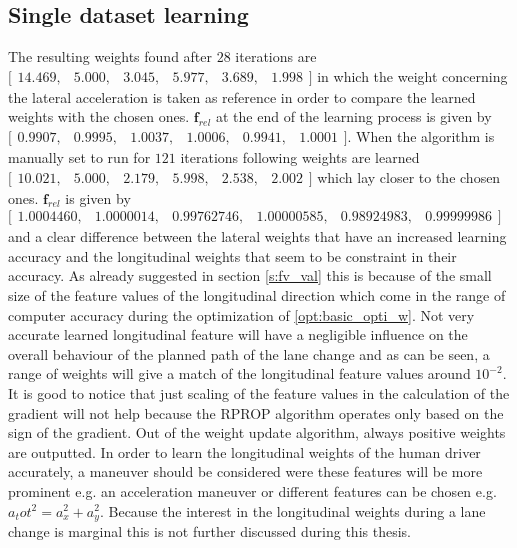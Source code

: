 \subsection{Single dataset learning}\label{s:SDL}
The resulting weights found after $28$ iterations are $\bigl[ \begin{smallmatrix} 14.469,&5.000,&3.045,&5.977,&3.689,&1.998\end{smallmatrix}\bigr]$ in which the weight concerning the lateral acceleration is taken as reference in order to compare the learned weights with the chosen ones. $\bm{f}_{rel}$ at the end of the learning process is given by $\bigl[ \begin{smallmatrix} 0.9907,&0.9995,&1.0037,&1.0006,&0.9941,&1.0001\end{smallmatrix}\bigr]$. When the algorithm is manually set to run for $121$ iterations following weights are learned $\bigl[ \begin{smallmatrix} 10.021,&5.000,&2.179,&5.998,&2.538,&2.002\end{smallmatrix}\bigr]$ which lay closer to the chosen ones.  $\bm{f}_{rel}$ is given by $\bigl[ \begin{smallmatrix} 1.0004460,&1.0000014,&0.99762746,&1.00000585,&0.98924983,&0.99999986\end{smallmatrix}\bigr]$ and a clear difference between the lateral weights that have an increased learning accuracy and the longitudinal weights that seem to be constraint in their accuracy. As already suggested in section \ref{s:fv_val} this is because of the small size of the feature values of the longitudinal direction which come in the range of computer accuracy during the optimization of \ref{opt:basic_opti_w}. Not very accurate learned longitudinal feature will have a negligible influence on the overall behaviour of the planned path of the lane change and as can be seen, a range of weights will give a match of the longitudinal feature values around $10^{-2}$. It is good to notice that just scaling of the feature values in the calculation of the gradient will not help because the RPROP algorithm operates only based on the sign of the gradient. Out of the weight update algorithm, always positive weights are outputted. In order to learn the longitudinal weights of the human driver accurately, a maneuver should be considered were these features will be more prominent e.g. an acceleration maneuver or different features can be chosen e.g. $a_tot^2 = a_x^2 + a_y^2$. Because the interest in the longitudinal weights during a lane change is marginal this is not further discussed during this thesis.\\          

